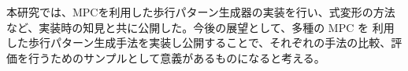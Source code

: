 
本研究では、MPCを利用した歩行パターン生成器の実装を行い、式変形の方法など、実装時の知見と共に公開した。今後の展望として、多種の MPC を 利用した歩行パターン生成手法を実装し公開することで、それぞれの手法の比較、評価を行うためのサンプルとして意義があるものになると考える。